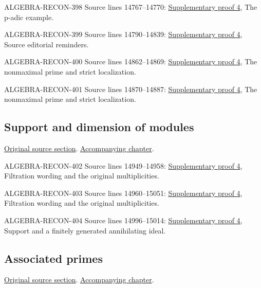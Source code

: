 \begin{AlgebraSourceRoutes}
\item[ALGEBRA-RECON-398] Source lines 14767--14770: \hyperlink{algebra_dimension_support_associated_notes_20260927}{Supplementary proof 4}, The p-adic example.
\item[ALGEBRA-RECON-399] Source lines 14790--14839: \hyperlink{algebra_dimension_support_associated_notes_20260927}{Supplementary proof 4}, Source editorial reminders.
\item[ALGEBRA-RECON-400] Source lines 14862--14869: \hyperlink{algebra_dimension_support_associated_notes_20260927}{Supplementary proof 4}, The nonmaximal prime and strict localization.
\item[ALGEBRA-RECON-401] Source lines 14870--14887: \hyperlink{algebra_dimension_support_associated_notes_20260927}{Supplementary proof 4}, The nonmaximal prime and strict localization.
\end{AlgebraSourceRoutes}

\subsection{Support and dimension of modules}
\hypertarget{algebra-source-section-support}{}
\noindent\href{https://github.com/stacks/stacks-project/blob/a04446e57ec1fbc252a871afcec7752fb2807b14/algebra.tex\#L14909}{Original source section}. \href{algebra.pdf\#nameddest=section-support}{Accompanying chapter}.

\begin{AlgebraSourceRoutes}
\item[ALGEBRA-RECON-402] Source lines 14949--14958: \hyperlink{algebra_dimension_support_associated_notes_20260927}{Supplementary proof 4}, Filtration wording and the original multiplicities.
\item[ALGEBRA-RECON-403] Source lines 14960--15051: \hyperlink{algebra_dimension_support_associated_notes_20260927}{Supplementary proof 4}, Filtration wording and the original multiplicities.
\item[ALGEBRA-RECON-404] Source lines 14996--15014: \hyperlink{algebra_dimension_support_associated_notes_20260927}{Supplementary proof 4}, Support and a finitely generated annihilating ideal.
\end{AlgebraSourceRoutes}

\subsection{Associated primes}
\hypertarget{algebra-source-section-ass}{}
\noindent\href{https://github.com/stacks/stacks-project/blob/a04446e57ec1fbc252a871afcec7752fb2807b14/algebra.tex\#L15099}{Original source section}. \href{algebra.pdf\#nameddest=section-ass}{Accompanying chapter}.

